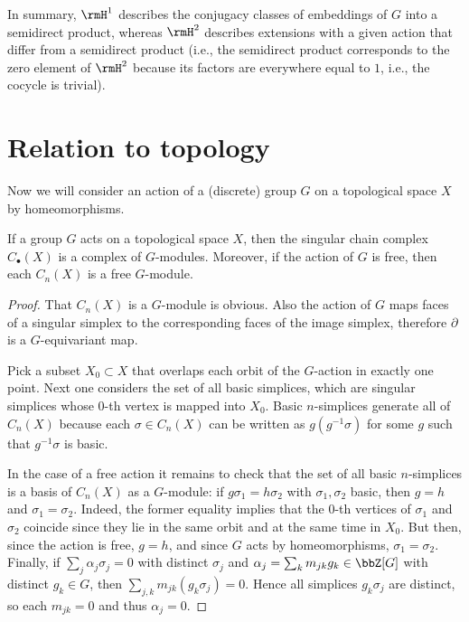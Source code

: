In summary, $\rmH^1$ describes the conjugacy classes of embeddings of $G$ into a semidirect product, whereas $\rmH^2$ describes extensions with a given action that differ from a semidirect product (i.e., the semidirect product corresponds to the zero element of $\rmH^2$ because its factors are everywhere equal to $1$, i.e., the cocycle is trivial).

\section{Relation to topology}

Now we will consider an action of a (discrete) group $G$
 on a topological space $X$ by homeomorphisms.

\begin{prop}
    If a group $G$ acts on a topological space $X$, then the singular chain complex $C_\bullet(X)$ is a complex of $G$-modules. Moreover, if the action of $G$ is free, then each $C_n(X)$ is a free $G$-module.
\end{prop}
\begin{proof}
    That $C_n(X)$ is a $G$-module is obvious. Also the action of $G$ maps faces of a singular simplex to the corresponding faces of the image simplex, therefore $\partial$ is a $G$-equivariant map.

    Pick a subset $X_0\subset X$ that overlaps each orbit of the $G$-action in exactly one point. Next one considers the set of all basic simplices, which are singular simplices whose $0$-th vertex is mapped into $X_0$. Basic $n$-simplices generate all of $C_n(X)$ because each $\sigma\in C_n(X)$ can be written as $g(g^{-1}\sigma)$ for some $g$ such that $g^{-1}\sigma$ is basic. 
    
    In the case of a free action it remains to check that the set of all basic $n$-simplices is a basis of $C_n(X)$ as a $G$-module: if $g\sigma_1=h\sigma_2$ with $\sigma_1,\sigma_2$ basic, then $g=h$ and $\sigma_1=\sigma_2$. Indeed, the  former equality implies that the $0$-th vertices of $\sigma_1$ and $\sigma_2$ coincide since they lie in the same orbit and at the same time in $X_0$. But then, since the action is free, $g=h$, and since $G$ acts by homeomorphisms, $\sigma_1=\sigma_2$. Finally, if $\sum_j\alpha_j\sigma_j=0$ with distinct $\sigma_j$ and $\alpha_j=\sum_km_{jk}g_k\in \bbZ[G]$ with distinct $g_k\in G$, then $\sum_{j,k}m_{jk}(g_k \sigma_j)=0$. Hence all simplices $g_k\sigma_j$ are distinct, so each $m_{jk}=0$ and thus $\alpha_j=0$.
\end{proof}

